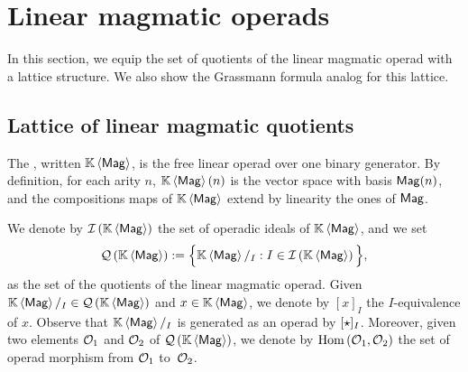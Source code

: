 \section{Linear magmatic operads}
\label{sec:Magmatic_operads}
In this section, we equip the set of quotients of the linear magmatic
operad with a lattice structure. We also show the Grassmann formula
analog for this lattice.
\medbreak

\subsection{Lattice of linear magmatic quotients}
The , written $\KMag$, is the free linear
operad over one binary generator. By definition, for each arity $n$,
$\KMag(n)$ is the vector space with basis $\Mag(n)$, and the
compositions maps of $\KMag$ extend by linearity the ones of $\Mag$.
\medbreak

We denote by $\IMag$ the set of operadic ideals of $\KMag$, and we set
\begin{equation} \label{equ:definition_of_QMag}
    \QMag := \Big\{\KMag/_I :  I\in\IMag\Big\},
\end{equation}
as the set of the quotients of the linear magmatic operad. Given
$\KMag/_I \in \QMag$ and $x \in \KMag$, we denote by $[x]_I$ the
$I$-equivalence of $x$. Observe that $\KMag/_I$ is generated as an
operad by $[\Product]_I$. Moreover, given two  elements $\Oca_1$ and
$\Oca_2$ of $\QMag$, we denote by $\Hom\left(\Oca_1,\Oca_2\right)$ the
set of operad morphism from $\Oca_1$ to~$\Oca_2$.
\medbreak

